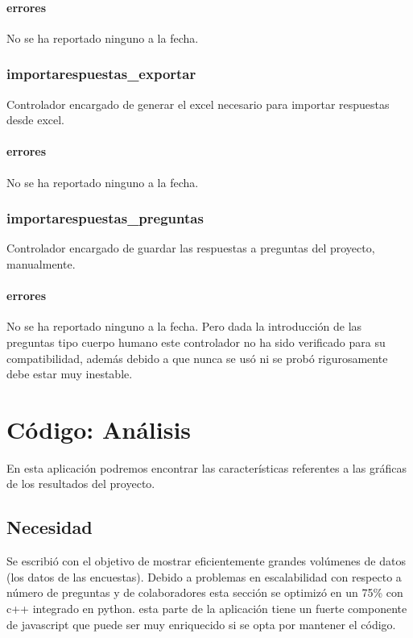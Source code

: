 \documentclass[10pt,a4paper]{book}
\begin{document}
	\subsubsection{errores}
	No se ha reportado ninguno a la fecha.
	
	\subsection{importarespuestas\_exportar}
	Controlador encargado de generar el excel necesario para importar respuestas desde excel.
	\subsubsection{errores}
	No se ha reportado ninguno a la fecha. 
	
	\subsection{importarespuestas\_preguntas}
	Controlador encargado de guardar las respuestas a preguntas del proyecto, manualmente.
	\subsubsection{errores}
	No se ha reportado ninguno a la fecha. Pero dada la introducción de las preguntas tipo cuerpo humano este controlador no ha sido verificado para su compatibilidad, además debido a que nunca se usó ni se probó rigurosamente debe estar muy inestable.
	
	
	\chapter{Código: Análisis}
	
	En esta aplicación podremos encontrar las características referentes a las gráficas de los resultados del proyecto.
	
	\section{Necesidad}
	
	Se escribió con el objetivo de mostrar eficientemente grandes volúmenes de datos (los datos de las encuestas). Debido a problemas en escalabilidad con respecto a número de preguntas y de colaboradores esta sección se optimizó en un 75\% con c++ integrado en python. esta parte de la aplicación tiene un fuerte componente de javascript que puede ser muy enriquecido si se opta por mantener el código.
	
\end{document}
